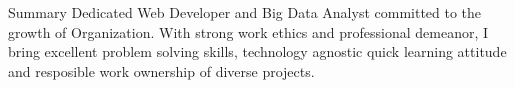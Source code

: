 \documentclass{resume} %
\begin{document}





\begin{rSection}{Summary}
Dedicated Web Developer and Big Data Analyst committed to the growth of Organization. With strong work ethics and professional demeanor, I bring excellent problem solving skills, technology agnostic quick learning attitude and resposible work ownership of diverse projects.
\end{rSection}

\end{document}
